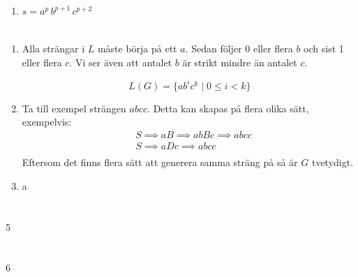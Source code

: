 \documentclass{article}
\begin{document}
\begin{enumerate}[label=(\alph*)]
    \item 
        $s = a^p \, b^{p+1} \,  c^{p+2}$
        
        
\end{enumerate}

\section{}

\begin{enumerate}[label=(\alph*)]
    \item 
        Alla strängar i $L$ måste börja på ett $a$. Sedan följer 0 eller flera $b$ och sist 1 eller flera $c$. Vi ser även att antalet $b$ är strikt mindre än antalet $c$.
        
        $$L(G) = \{ab^ic^k \mid 0 \le i < k\}$$
    \item
        Ta till exempel strängen $abcc$. Detta kan skapas på flera olika sätt, exempelvis:
        \begin{align*}
        &S \implies aB \implies abBc \implies abcc \\
        &S \implies aDc \implies abcc \\
        \end{align*}
        Eftersom det finns flera sätt att generera samma sträng på så är $G$ tvetydigt.

    \item 
    a
\end{enumerate}

\section{}
5

\section{}
6
\end{document}
